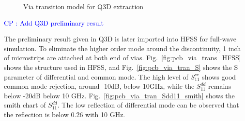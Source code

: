 \documentclass{book}  %
\newcommand{\cphighlight}[1]{\Huge\textcolor{blue}{CP : #1}\normalsize}
\begin{document}
\begin{paper}
\begin{figure}[h]
	\centering	
	\caption{Via transition model for Q3D extraction}
\end{figure}

\cphighlight{Add Q3D preliminary result}

The preliminary result given in Q3D is later imported into HFSS for full-wave simulation. To eliminate the higher order mode around the discontinuity,  1 inch of microstrips are attached at both end of vias. Fig.~\ref{fig:pcb_via_trans_HFSS} shows the structure used in HFSS, and Fig.~\ref{fig:pcb_via_tran_S} shows the S parameter of differential and common mode. The high level of $S^{cc}_{11}$ shows good common mode rejection, around -10dB, below 10GHz, while the $S^{dd}_{11}$ remains below -20dB below 10 GHz. Fig.~\ref{fig:pcb_via_tran_Sdd11_smith} shows the smith chart of $S^{dd}_{11}$. The low reflection of differential mode can be observed that the reflection is below 0.26 with 10 GHz.


\end{paper}
\end{document}
